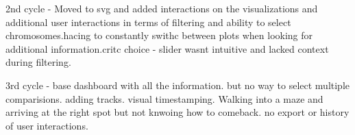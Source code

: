 2nd cycle - Moved to svg and added interactions on the visualizations and additional user interactions in terms of filtering and ability to select chromosomes.hacing to constantly swithc between plots when looking for additional information.critc choice - slider wasnt intuitive and lacked context during filtering.

3rd cycle - base dashboard with all the information. but no way to select multiple comparisions. adding tracks. visual timestamping. Walking into a maze and arriving at the right spot but not knwoing how to comeback. no export or history of user interactions.
